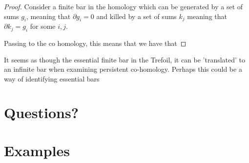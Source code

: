 \documentclass[11pt,oneside]{amsart}
\begin{document}
\begin{proof}


Consider a finite bar in the homology which can be generated by a set of sums ${g_i}$, meaning that $\partial g_i = 0$ and killed by a set of sums ${k_j}$ meaning that $\partial k_j = g_i$ for some $i,j$.

Passing to the co homology, this means that we have that 

\end{proof}








\begin{proposition}
    It seems as though the essential finite bar in the Trefoil, it can be 'translated' to an infinite bar when examining persistent co-homology. Perhaps this could be a way of identifying essential bars
\end{proposition}







\section{Questions?}



\section{Examples}


\end{document}
